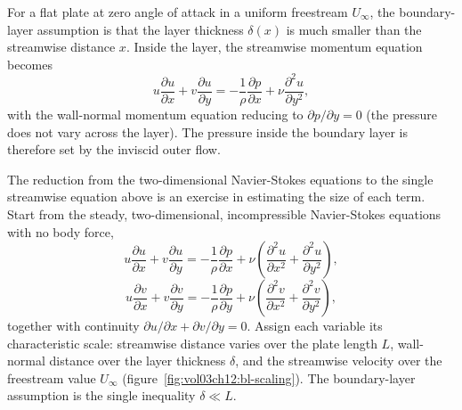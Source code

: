 For a flat plate at zero angle of attack in a uniform freestream
$U_\infty$, the boundary-layer assumption is that the layer
thickness $\delta(x)$ is much smaller than the streamwise distance
$x$. Inside the layer, the streamwise momentum equation becomes
\[
u\frac{\partial u}{\partial x} + v\frac{\partial u}{\partial y} =
-\frac{1}{\rho}\frac{\partial p}{\partial x} + \nu\frac{\partial^2
u}{\partial y^2},
\]
with the wall-normal momentum equation reducing to $\partial
p/\partial y = 0$ (the pressure does not vary across the layer).
The pressure inside the boundary layer is therefore set by the
inviscid outer flow.

 The reduction from the two-dimensional Navier-Stokes
equations to the single streamwise equation above is an exercise in
estimating the size of each term. Start from the steady,
two-dimensional, incompressible Navier-Stokes equations with no body
force,
\[
u\frac{\partial u}{\partial x} + v\frac{\partial u}{\partial y} =
-\frac1\rho\frac{\partial p}{\partial x} + \nu\!\left(
\frac{\partial^2 u}{\partial x^2} + \frac{\partial^2 u}{\partial y^2}
\right),
\]
\[
u\frac{\partial v}{\partial x} + v\frac{\partial v}{\partial y} =
-\frac1\rho\frac{\partial p}{\partial y} + \nu\!\left(
\frac{\partial^2 v}{\partial x^2} + \frac{\partial^2 v}{\partial y^2}
\right),
\]
together with continuity $\partial u/\partial x + \partial v/\partial y
= 0$. Assign each variable its characteristic scale: streamwise
distance varies over the plate length $L$, wall-normal distance over
the layer thickness $\delta$, and the streamwise velocity over the
freestream value $U_\infty$ (figure~\ref{fig:vol03ch12:bl-scaling}).
The boundary-layer assumption is the single inequality
$\delta \ll L$.

